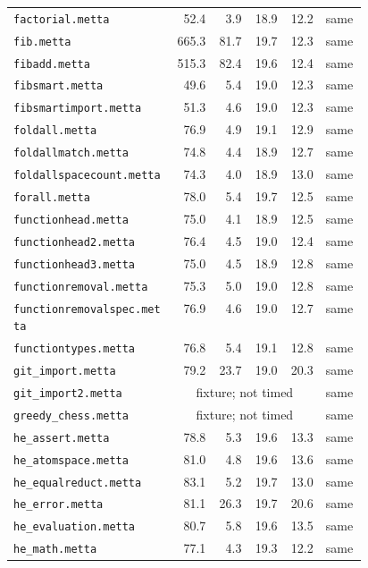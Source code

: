 \begin{longtable}{@{}p{0.46\linewidth}rrrrl@{}}
\nolinkurl{factorial.metta} & 52.4 & 3.9 & 18.9 & 12.2 & same \\
\nolinkurl{fib.metta} & 665.3 & 81.7 & 19.7 & 12.3 & same \\
\nolinkurl{fibadd.metta} & 515.3 & 82.4 & 19.6 & 12.4 & same \\
\nolinkurl{fibsmart.metta} & 49.6 & 5.4 & 19.0 & 12.3 & same \\
\nolinkurl{fibsmartimport.metta} & 51.3 & 4.6 & 19.0 & 12.3 & same \\
\nolinkurl{foldall.metta} & 76.9 & 4.9 & 19.1 & 12.9 & same \\
\nolinkurl{foldallmatch.metta} & 74.8 & 4.4 & 18.9 & 12.7 & same \\
\nolinkurl{foldallspacecount.metta} & 74.3 & 4.0 & 18.9 & 13.0 & same \\
\nolinkurl{forall.metta} & 78.0 & 5.4 & 19.7 & 12.5 & same \\
\nolinkurl{functionhead.metta} & 75.0 & 4.1 & 18.9 & 12.5 & same \\
\nolinkurl{functionhead2.metta} & 76.4 & 4.5 & 19.0 & 12.4 & same \\
\nolinkurl{functionhead3.metta} & 75.0 & 4.5 & 18.9 & 12.8 & same \\
\nolinkurl{functionremoval.metta} & 75.3 & 5.0 & 19.0 & 12.8 & same \\
\nolinkurl{functionremovalspec.metta} & 76.9 & 4.6 & 19.0 & 12.7 & same \\
\nolinkurl{functiontypes.metta} & 76.8 & 5.4 & 19.1 & 12.8 & same \\
\nolinkurl{git_import.metta} & 79.2 & 23.7 & 19.0 & 20.3 & same \\
\nolinkurl{git_import2.metta} & \multicolumn{4}{c}{fixture; not timed} & same \\
\nolinkurl{greedy_chess.metta} & \multicolumn{4}{c}{fixture; not timed} & same \\
\nolinkurl{he_assert.metta} & 78.8 & 5.3 & 19.6 & 13.3 & same \\
\nolinkurl{he_atomspace.metta} & 81.0 & 4.8 & 19.6 & 13.6 & same \\
\nolinkurl{he_equalreduct.metta} & 83.1 & 5.2 & 19.7 & 13.0 & same \\
\nolinkurl{he_error.metta} & 81.1 & 26.3 & 19.7 & 20.6 & same \\
\nolinkurl{he_evaluation.metta} & 80.7 & 5.8 & 19.6 & 13.5 & same \\
\nolinkurl{he_math.metta} & 77.1 & 4.3 & 19.3 & 12.2 & same \\

\end{longtable}
